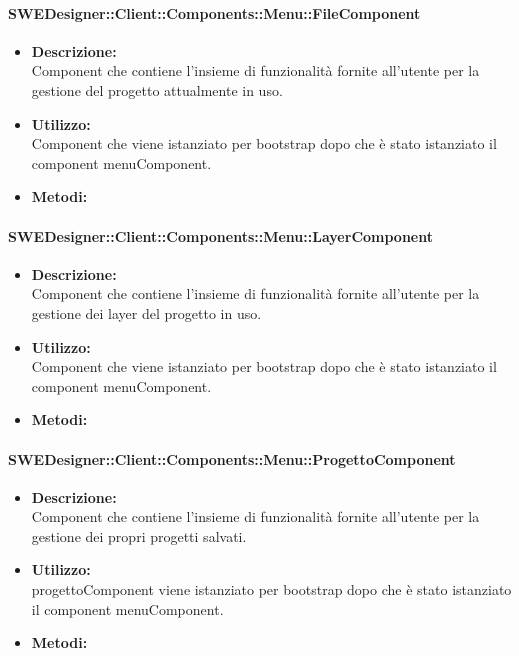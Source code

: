 			\paragraph{SWEDesigner::Client::Components::Menu::FileComponent}
				\begin{itemize}
          			\item \textbf{Descrizione:}\\
          			Component che contiene l’insieme di funzionalità fornite all’utente per la gestione del progetto attualmente in uso.
          			\item \textbf{Utilizzo:}\\
          			Component che viene istanziato per bootstrap dopo che è stato istanziato il component menuComponent.
          			\item \textbf{Metodi:}\\
          		\end{itemize}
			\paragraph{SWEDesigner::Client::Components::Menu::LayerComponent}
				\begin{itemize}
          			\item \textbf{Descrizione:}\\
          			Component che contiene l’insieme di funzionalità fornite all’utente per la gestione dei layer del progetto in uso.
          			\item \textbf{Utilizzo:}\\
          			Component che viene istanziato per bootstrap dopo che è stato istanziato il component menuComponent.
          			\item \textbf{Metodi:}\\
          		\end{itemize}
			\paragraph{SWEDesigner::Client::Components::Menu::ProgettoComponent}
				\begin{itemize}
          			\item \textbf{Descrizione:}\\
          			Component che contiene l’insieme di funzionalità fornite all’utente per la gestione dei propri progetti salvati.
          			\item \textbf{Utilizzo:}\\
          			progettoComponent viene istanziato per bootstrap dopo che è stato istanziato il component menuComponent.
          			\item \textbf{Metodi:}\\
          		\end{itemize}
